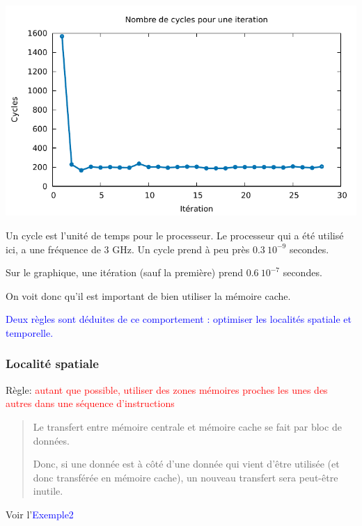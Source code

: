 \documentclass{beamer}
\begin{document}
\begin{frame}
	\begin{center}
	\includegraphics[scale=0.8]{Exemples/Exemple1/cycles.pdf}
	\end{center}

Un cycle est l'unité de temps pour le processeur. Le processeur qui a été utilisé ici, a une fréquence de 3 GHz.
Un cycle prend à peu près $0.3\ 10^{-9}$ secondes. 
\vfill

Sur le graphique, une itération (sauf la première) prend $0.6\ 10^{-7}$ secondes.
\end{frame}

\begin{frame}
\vfill
On voit donc qu'il est important de bien utiliser la mémoire cache.

\vfill
   \textcolor{blue}{Deux règles sont déduites de ce comportement : optimiser les localités spatiale et temporelle.}
\vfill 
\end{frame}

\begin{frame}
\frametitle{Localit\'e spatiale}
Règle:  \textcolor{red}{autant que possible, utiliser des zones m\'emoires proches les unes des autres dans une s\'equence d'instructions}
	\vfill
\begin{quote}
	Le transfert entre m\'emoire centrale et m\'emoire cache se fait par bloc de donn\'ees.
	
	Donc, si une donn\'ee est \`a c\^ot\'e d'une donn\'ee qui vient d'\^etre utilis\'ee (et donc transf\'er\'ee en m\'emoire cache), un nouveau transfert sera peut-\^etre inutile.
\end{quote}

\vfill
Voir l'\textcolor{blue}{Exemple2}
\end{frame}
\end{document}
